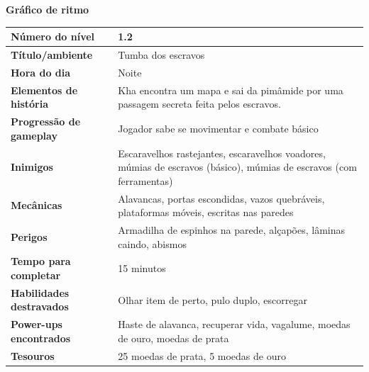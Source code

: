 \expandafter\documentclass\expandafter[table, usenames, svgnames, dvipsnames, \classopts]{beamer}
\begin{document}
\begin{frame}{\textbf{Gráfico de ritmo}}
    \scriptsize
    \begin{table}[h]
    \begin{tabular}{l p{6cm}}
    \hline
    \textbf{Número do nível}         & 1.2                                                                                                                 \\ \hline
    \textbf{Título/ambiente}         & Tumba dos escravos                                                                                                  \\ \hline
    \textbf{Hora do dia}             & Noite                                                                                                               \\ \hline
    \textbf{Elementos de história}   & Kha encontra um mapa e sai da pimâmide por uma passagem secreta feita pelos escravos.                               \\ \hline
    \textbf{Progressão de gameplay}  & Jogador sabe se movimentar e combate básico                                                                         \\ \hline
    \textbf{Inimigos}                & Escaravelhos rastejantes, escaravelhos voadores, múmias de escravos (básico), múmias de escravos (com ferramentas)  \\ \hline
    \textbf{Mecânicas}               & Alavancas, portas escondidas, vazos quebráveis, plataformas móveis, escritas nas paredes                            \\ \hline
    \textbf{Perigos}                 & Armadilha de espinhos na parede, alçapões, lâminas caindo, abismos                                                  \\ \hline
    \textbf{Tempo para completar}    & 15 minutos                                                                                                          \\ \hline
    \textbf{Habilidades destravados} & Olhar item de perto, pulo duplo, escorregar                                                                         \\ \hline
    \textbf{Power-ups encontrados}   & Haste de alavanca, recuperar vida, vagalume, moedas de ouro, moedas de prata                                        \\ \hline
    \textbf{Tesouros}                & 25 moedas de prata, 5 moedas de ouro                                                                                \\ \hline

\end{tabular}
\end{table}
\end{frame}
\end{document}

